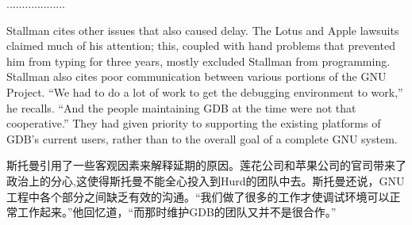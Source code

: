 \ifdefined\chs
...................
\fi

\ifdefined\eng
Stallman cites other issues that also caused delay. The Lotus and Apple lawsuits claimed much of his attention; this, coupled with hand problems that prevented him from typing for three years, mostly excluded Stallman from programming.  Stallman also cites poor communication between various portions of the GNU Project. ``We had to do a lot of work to get the debugging environment to work,'' he recalls. ``And the people maintaining GDB at the time were not that cooperative.'' They had given priority to supporting the existing platforms of GDB's current users, rather than to the overall goal of a complete GNU system.
\fi

\ifdefined\chs
斯托曼引用了一些客观因素来解释延期的原因。莲花公司和苹果公司的官司带来了政治上的分心,这使得斯托曼不能全心投入到Hurd的团队中去。斯托曼还说，GNU工程中各个部分之间缺乏有效的沟通。``我们做了很多的工作才使调试环境可以正常工作起来。''他回忆道，``而那时维护GDB的团队又并不是很合作。''
\fi

